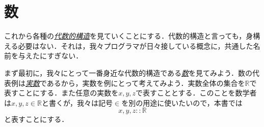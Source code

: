\documentclass[a4paper]{jsbook}
\newcommand{\keyword}[1]{{\underline{\emph{#1}}}}
\newcommand{\mathSpecialSet}[1]{\mathbb{#1}} %
\newcommand{\mathIn}{\mathrel{::}}
\begin{document}
\section{数}

これから各種の\keyword{代数的構造}を見ていくことにする．代数的構造と言っても，身構える必要はない．それは，我々プログラマが日々接している概念に，共通した名前を与えたにすぎない．

まず最初に，我々にとって一番身近な代数的構造である\keyword{数}を見てみよう．数の代表例は\keyword{実数}であるから，実数を例にとって考えてみよう．実数全体の集合を$\mathSpecialSet{R}$で表すことにする．また任意の実数を$x,y,z$で表すこととする．このことを数学者は$x,y,z\in\mathSpecialSet{R}$と書くが，我々は記号$\in$を別の用途に使いたいので，本書では
\begin{equation}
x,y,z\mathIn\mathSpecialSet{R}
\end{equation}
と表すことにする．
\end{document}
